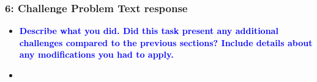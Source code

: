 \documentclass[../report.tex]{subfiles}
\begin{document}
    \begin{frame}[t]
        \frametitle{6: Challenge Problem Text response}
        \begin{normalsize}
            \begin{itemize}
                \setlength\itemsep{1em}\fontsize{6pt}{6pt}

                \item[]{\textbf{\selectfont\textcolor{blue}{ Describe what you did. Did this task present any additional challenges compared to the previous sections?  Include details about any modifications you had to apply. }}}
                
                \item[]\textbf{}
            \end{itemize}
        \end{normalsize}
    \end{frame}
\end{document}
